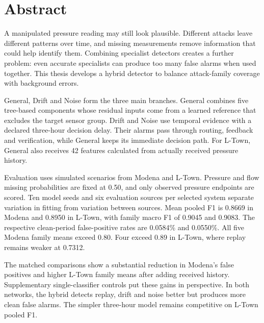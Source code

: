 \chapter*{Abstract}

A manipulated pressure reading may still look plausible. Different attacks leave different patterns over time, and missing measurements remove information that could help identify them. Combining specialist detectors creates a further problem: even accurate specialists can produce too many false alarms when used together. This thesis develops a hybrid detector to balance attack-family coverage with background errors.

General, Drift and Noise form the three main branches. General combines five tree-based components whose residual inputs come from a learned reference that excludes the target sensor group. Drift and Noise use temporal evidence with a declared three-hour decision delay. Their alarms pass through routing, feedback and verification, while General keeps its immediate decision path. For L-Town, General also receives 42 features calculated from actually received pressure history.

Evaluation uses simulated scenarios from Modena and L-Town. Pressure and flow missing probabilities are fixed at 0.50, and only observed pressure endpoints are scored. Ten model seeds and six evaluation sources per selected system separate variation in fitting from variation between sources. Mean pooled F1 is 0.8669 in Modena and 0.8950 in L-Town, with family macro F1 of 0.9045 and 0.9083. The respective clean-period false-positive rates are 0.0584\% and 0.0550\%. All five Modena family means exceed 0.80. Four exceed 0.89 in L-Town, where replay remains weaker at 0.7312.

The matched comparisons show a substantial reduction in Modena's false positives and higher L-Town family means after adding received history. Supplementary single-classifier controls put these gains in perspective. In both networks, the hybrid detects replay, drift and noise better but produces more clean false alarms. The simpler three-hour model remains competitive on L-Town pooled F1.
